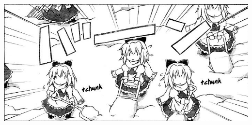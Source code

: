 \documentclass[a4paper, twoside]{article}
\title{\vspace{18.5cm}\fontsize{40pt}{\baselineskip}\selectfont{Standard Code Library}}
\author{\fontsize{15pt}{\baselineskip}\selectfont{antileaf}\vspace{2.6cm}}
\date{}
\begin{document}
	\begin{titlepage}
		
	\end{titlepage}

	\pagestyle{plain}

	\setcounter{page}{1}

	\begin{multicols}{2}
		
		\begin{spacing}{1}
			\renewcommand{\contentsname}{\huge{目录}}
			\tableofcontents
		\end{spacing}

	\end{multicols}
	
	\vspace{\fill}
	\centerline{\includegraphics[width=0.4\linewidth,trim=0.08cm 0.1cm 0 0.05cm,clip]{image/sweeping.jpg}}
	\vspace{\fill}

	\newpage

	\pagestyle{fancy}

	\setcounter{page}{1}
\end{document}
